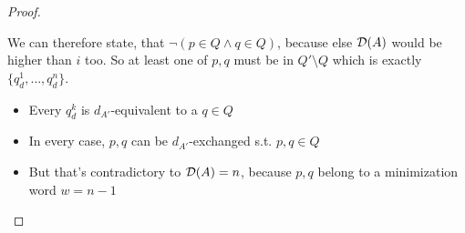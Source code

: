 \begin{proof}
\begin{description}
		
		We can therefore state, that $\neg(p \in Q \land q \in Q)$, because else $\mathcal{D}(A)$ would be higher than $i$ too.  So at least one of $p,q$ must be in $Q' \setminus Q$ which is exactly $\{ q_d^1, \ldots, q_d^n \}$.
		
		\begin{itemize}
			\item Every $q_d^k$ is $d_{A'}$-equivalent to a $q \in Q$
			\item In every case, $p,q$ can be $d_{A'}$-exchanged s.t. $p,q \in Q$
			\item But that's contradictory to $\mathcal{D}(A) = n$, because $p,q$ belong to a minimization word $w = n-1$
		\end{itemize}
		
%		
%		
%		
%		
	\end{description}
\end{proof}


